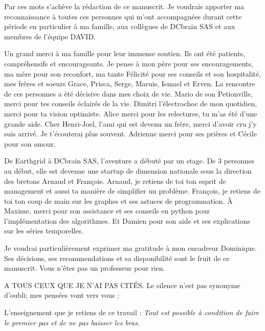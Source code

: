 

Par ces mots s'ach\`eve la r\'edaction de ce manuscrit.
Je voudrais apporter ma reconnaissance \`a toutes ces personnes qui m'ont accompagn\'ees durant cette p\'eriode en particulier \`a ma famille, aux coll\`egues de DCbrain SAS et aux membres de l'\'equipe DAVID.
\newline 

Un grand merci \`a ma famille pour leur immense soutien. Ils ont \'et\'e patients, compr\'ehensifs et encourageants. Je pense \`a mon p\`ere pour ses encouragements, ma m\`ere pour son reconfort, ma tante F\'elicit\'e pour ses conseils et son hospitalit\'e, mes fr\`eres et soeurs Grace, Prisca, Serge, Maruis, Ismael et Erven. 
\newline
La rencontre de ces personnes a \'et\'e d\'ecisive dans mes choix de vie. 
Mario de son Petionville, merci pour tes conseils \'eclair\'es de la vie.
Dimitri l'\'electrochoc de mon quotidien, merci pour ta vision optimiste. 
Alice merci pour les relectures, tu m'as \'et\'e d'une grande aide.
Cher Henri-Joel, l'ami qui est devenu un fr\`ere, merci d'avoir cru j'y suis arriv\'e. Je t'\'ecouterai plus souvent.   
Adrienne merci pour ses pri\`eres et C\'ecile pour son amour.
\newline

De Earthgrid \`a DCbrain SAS, l'aventure a d\'ebut\'e par un stage. De $3$ personnes au d\'ebut, elle est devenue une startup de dimension nationale sous la direction des bretons Arnaud et Fran{\c c}ois. 
Arnaud, je retiens de toi ton esprit de management et aussi ta mani\`ere de simplifier un probl\`eme.
Fran{\c c}ois, je retiens  de toi ton  coup de main sur les graphes et ses astuces de programmation.
\`A Maxime, merci pour son assistance et ses conseils en python pour l'impl\'ementation des algorithmes.
Et Damien pour son aide et ses explications sur les s\'eries temporelles.
\newline

Je voudrai particuli\`erement exprimer ma gratitude \`a  mon encadreur Dominique. Ses d\'ecisions, ses recommendations et sa disponibilit\'e sont le fruit de ce manuscrit. 
Vous n'\^etes pas un professeur pour rien.
\newline

A TOUS CEUX QUE JE N'AI PAS CIT\'ES.
Le silence n'est pas synonyme d'oubli; mes pens\'ees vont vers vous ;
\newline

L'enseignement que je retiens de ce travail : \newline
{\em Tout est possible \`a condition de faire le premier pas et de ne pas baisser les bras.}
